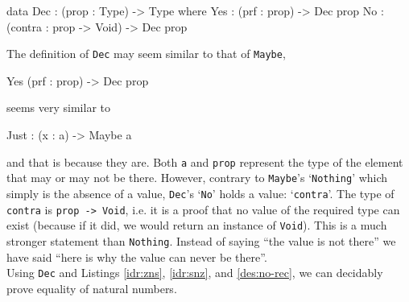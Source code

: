     \begin{code}[caption={\texttt{Dec} as defined in the \Idris prelude}]
            data Dec : (prop : Type) -> Type where
                Yes : (prf : prop) -> Dec prop
                No  : (contra : prop -> Void) -> Dec prop
    \end{code}
    The definition of \texttt{Dec} may seem similar to that of \texttt{Maybe},
    
    \begin{code}
        Yes (prf : prop) -> Dec prop
    \end{code}
    seems very similar to
    
    \begin{code}
        Just : (x : a) -> Maybe a
    \end{code}
    and that is because they are. Both \texttt{a} and \texttt{prop} represent the type of the element that may or may not be there. However, contrary to \texttt{Maybe}'s `\texttt{Nothing}' which simply is the absence of a value, \texttt{Dec}'s `\texttt{No}' holds a value: `\texttt{contra}'. The type of \texttt{contra} is \texttt{prop -> Void}, i.e. it is a proof that no value of the required type can exist (because if it did, we would return an instance of \texttt{Void}). This is a much stronger statement than \texttt{Nothing}. Instead of saying ``the value is not there'' we have said ``here is why the value can never be there''.
    \\
        
    Using \texttt{Dec} and Listings \ref{idr:zns}, \ref{idr:snz}, and \ref{des:no-rec}, we can decidably prove equality of natural numbers.

